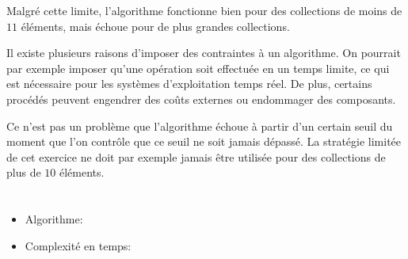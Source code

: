 {{Malgré cette limite, l’algorithme fonctionne bien pour des collections de moins de $11$ éléments, mais échoue pour de plus grandes collections.

Il existe plusieurs raisons d’imposer des contraintes à un algorithme. On pourrait par exemple imposer qu’une opération soit effectuée en un temps limite, ce qui est nécessaire pour les systèmes d’exploitation temps réel. De plus, certains procédés peuvent engendrer des coûts externes ou endommager des composants.

Ce n’est pas un problème que l’algorithme échoue à partir d’un certain seuil du moment que l’on contrôle que ce seuil ne soit jamais dépassé. La stratégie limitée de cet exercice ne doit par exemple jamais être utilisée pour des collections de plus de $10$ éléments.



\section*{\BrochureWebsitesAndKeywords}
{\raggedright
\begin{itemize}
  \item Algorithme: \href{https://fr.wikipedia.org/wiki/Algorithme}{}
  \item Complexité en temps: \href{https://fr.wikipedia.org/wiki/Complexit\%C3\%A9_en_temps}{}
\end{itemize}


}

}{}

\def\AuthorChanS{} %
\def\AuthorPrettiJ{} %
\def\AuthorRoffeyC{} %
\def\AuthorKimD{} %
\def\AuthorKimH{} %
\def\AuthorBaumannW{} %
\def\AuthorPohlW{} %
\def\AuthorDatzkoS{} %
\def\AuthorPelletE{} %

\newpage}{}

